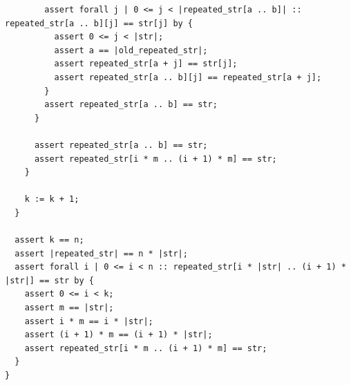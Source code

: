 \documentclass{article}
\begin{document}
\begin{lstlisting}
        assert forall j | 0 <= j < |repeated_str[a .. b]| :: repeated_str[a .. b][j] == str[j] by {
          assert 0 <= j < |str|;
          assert a == |old_repeated_str|;
          assert repeated_str[a + j] == str[j];
          assert repeated_str[a .. b][j] == repeated_str[a + j];
        }
        assert repeated_str[a .. b] == str;
      }

      assert repeated_str[a .. b] == str;
      assert repeated_str[i * m .. (i + 1) * m] == str;
    }

    k := k + 1;
  }

  assert k == n;
  assert |repeated_str| == n * |str|;
  assert forall i | 0 <= i < n :: repeated_str[i * |str| .. (i + 1) * |str|] == str by {
    assert 0 <= i < k;
    assert m == |str|;
    assert i * m == i * |str|;
    assert (i + 1) * m == (i + 1) * |str|;
    assert repeated_str[i * m .. (i + 1) * m] == str;
  }
}
\end{lstlisting}
\end{document}
